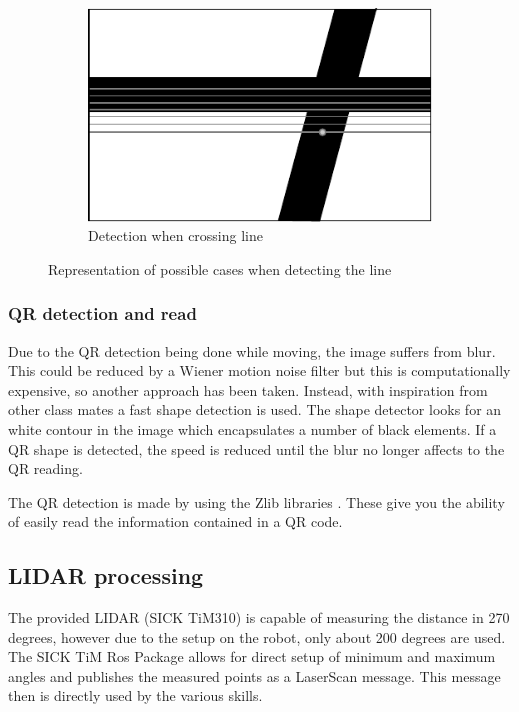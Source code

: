 \begin{figure}
\begin{subfigure}[H]{0.296\textwidth}
	            \includegraphics[width=\textwidth]{figs/mr_camera_processing_3}
	            \caption{Detection when crossing line}
	            \label{fig:mr_camera_processing_3}
	    	\end{subfigure}
	    \caption{Representation of possible cases when detecting the line}
	    \end{figure}

	\subsubsection{QR detection and read} %
	\label{ssub:qr_detection_and_read}
	Due to the QR detection being done while moving, the image suffers from blur.
	This could be reduced by a Wiener motion noise filter but this is computationally expensive, so another approach has been taken.
	Instead, with inspiration from other class mates a fast shape detection is used. The shape detector looks for an white contour in the image which encapsulates a number of black elements. If a QR shape is detected, the speed is reduced until the blur no longer affects to the QR reading.

	The QR detection is made by using the Zlib libraries \cite{zlib}. 
	These give you the ability of easily read the information contained in a QR code.



	\subsection{LIDAR processing} %
	\label{sub:mr_lidar_processing}
	The provided LIDAR (SICK TiM310) is capable of measuring the distance in 270 degrees, however due to the setup on the robot, only about 200 degrees are used. The SICK TiM Ros Package \cite{sick_tim} allows for direct setup of minimum and maximum angles and publishes the measured points as a LaserScan message. This message then is directly used by the various skills.

